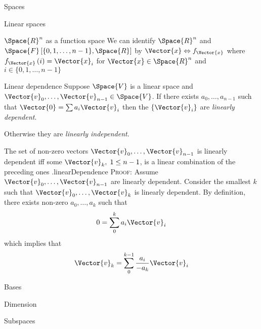 \begin{plSection}{Spaces}
\begin{plSection}{Linear spaces}
\begin{plExample}{{ $\Space{R}^n$ as a function space }}{}
We can identify  
$\Space{R}^n$ and 
$ \Space{F} \left[ \{ 0, 1, \ldots, {n-1} \}, \Space{R} \right] $
by
$\Vector{x} \Leftrightarrow f_{\Vector{x}}$
where $f_{\Vector{x}} \left( i \right) = \Vector{x}_i$
for $\Vector{x} \in \Space{R}^n$ and 
$i \in \{ 0, 1, \ldots, {n-1} \}$
\end{plExample}

\begin{plDefinition}{Linear dependence}{}
Suppose $\Space{V}$ is a linear space and
$\Vector{v}_0, \ldots , \Vector{v}_{n-1} \in \Space{V}$.
If there exists $a_0, \ldots , a_{n-1}$ such that
$\Vector{0} = \sum a_i \Vector{v}_i$ then the $\{ \Vector{v}_i \}$
are \textit{linearly dependent}.

Otherwise they are \textit{linearly independent}.
\end{plDefinition}

\begin{plTheorem}{The set of non-zero vectors
 $\Vector{v}_0, \ldots ,\Vector{v}_{n-1}$
is linearly dependent iff some $\Vector{v}_k, \; 1 \leq n-1$, 
is a linear combination of the preceding 
ones .}{linearDependence}
\textsc{Proof:}
Assume  $\Vector{v}_0, \ldots ,\Vector{v}_{n-1}$ are linearly dependent.
Consider the smallest $k$ such that 
$\Vector{v}_0, \ldots ,\Vector{v}_{k}$ is linearly dependent.
By definition,
there exists non-zero $a_0, \ldots ,a_{k}$ such that
\begin{equation}
0 = \sum_0^k a_i \Vector{v}_i
\end{equation}
which implies that
\begin{equation}
\Vector{v}_k = \sum_0^{k-1} \frac{a_i}{- a_k} \Vector{v}_i
\end{equation}

\end{plTheorem}
\begin{plSection}{Bases}
\end{plSection}%
\begin{plSection}{Dimension}
\end{plSection}%
\begin{plSection}{Subspaces}


\end{plSection}
\end{plSection}
\end{plSection}
